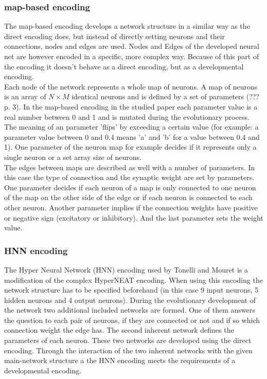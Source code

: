 \documentclass[12pt,twoside]{article}
\theoremstyle{plain}
\theoremstyle{definition}
\theoremstyle{remark}
\begin{document}
\subsubsection{map-based encoding}
The map-based encoding develops a network structure in a similar way as the direct encoding does, but instead of directly setting neurons and their connections, nodes and edges are used.
Nodes and Edges of the developed neural net are however encoded in a specific, more complex way. Because of this part of the encoding it doesn't behave as a direct encoding, but as a developmental encoding.\\
Each node of the network represents a whole map of neurons. A map of neurons is an array of $N \times M$ identical neurons and is defined by a set of parameters (??? \cite{tonelli2011using} p. 3). 
In the map-based encoding in the studied paper each parameter value is a real number between 0 and 1 and is mutated during the evolutionary process.
The meaning of an parameter 'flips' by exceeding a certain value (for example: a parameter value between 0 and 0.4 means 'a' and 'b' for a value between 0.4 and 1).
One parameter of the neuron map for example decides if it represents only a single neuron or a set array size of neurons.\\
The edges between maps are described as well with a number of parameters.
In this case the type of connection and the synaptic weight are set by parameters.
One parameter decides if each neuron of a map is only connected to one neuron of the map on the other side of the edge or if each neuron is connected to each other neuron.
Another parameter implies if the connection weights have positive or negative sign (excitatory or inhibitory). And the last parameter sets the weight value.

\subsubsection{HNN encoding}
The Hyper Neural Network (HNN) encoding used by Tonelli and Mouret is a modification of the complex HyperNEAT encoding.
When using this encoding the network structure has to be specified beforehand (in this case 9 input neurons, 5 hidden neurons and 4 output neurons).
During the evolutionary development of the network two additional included networks are formed. One of them answers the question to each pair of neurons, if they are connected or not and if so which connection weight the edge has.
The second inherent network defines the parameters of each neuron. These two networks are developed using the direct encoding.
Through the interaction of the two inherent networks with the given main-network structure a the HNN encoding meets the requirements of a developmental encoding.
\end{document}
